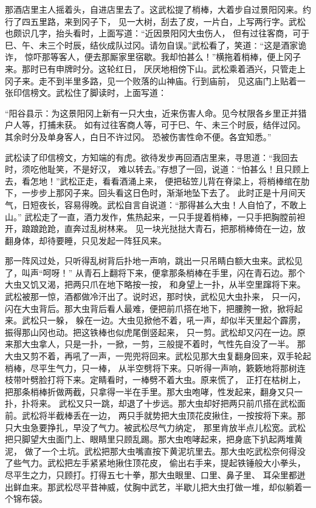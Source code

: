 \documentclass[12pt,UTF8]{ctexbook}
\begin{document}
那酒店里主人摇着头，自进店里去了。这武松提了梢棒，大着步自过景阳冈来。约行了四五里路，来到冈子下，
见一大树，刮去了皮，一片白，上写两行字。武松也颇识几字，抬头看时，上面写道：“近因景阳冈大虫伤人，
但有过往客商，可于巳、午、未三个时辰，结伙成队过冈。请勿自误。”武松看了，笑道∶“这是酒家诡诈，
惊吓那等客人，便去那厮家里宿歇。我却怕甚么！”横拖着梢棒，便上冈子来。那时已有申牌时分。这轮红日，
厌厌地相傍下山。武松乘着酒兴，只管走上冈子来。走不到半里多路，见一个败落的山神庙。行到庙前，
见这庙门上贴着一张印信榜文。武松住了脚读时，上面写道：

“阳谷县示：为这景阳冈上新有一只大虫，近来伤害人命。见今杖限各乡里正并猎户人等，打捕未获。
如有过往客商人等，可于巳、午、未三个时辰，结伴过冈。其余时分及单身客人，白日不许过冈。
恐被伤害性命不便。各宜知悉。”

武松读了印信榜文，方知端的有虎。欲待发步再回酒店里来，寻思道：“我回去时，须吃他耻笑，不是好汉，
难以转去。”存想了一回，说道：“怕甚么！且只顾上去，看怎地！”武松正走，看看酒涌上来，
便把毡笠儿背在脊梁上，将梢棒绾在肋下，一步步上那冈子来。回头看这日色时，渐渐地坠下去了。
此时正是十月间天气，日短夜长，容易得晚。武松自言自说道：“那得甚么大虫！人自怕了，不敢上山。”
武松走了一直，酒力发作，焦热起来，一只手提着梢棒，一只手把胸膛前袒开，踉踉跄跄，直奔过乱树林来。
见一块光挞挞大青石，把那梢棒倚在一边，放翻身体，却待要睡，只见发起一阵狂风来。

那一阵风过处，只听得乱树背后扑地一声响，跳出一只吊睛白额大虫来。武松见了，叫声“呵呀！”
从青石上翻将下来，便拿那条梢棒在手里，闪在青石边。那个大虫又饥又渴，把两只爪在地下略按一按，
和身望上一扑，从半空里蹿将下来。武松被那一惊，酒都做冷汗出了。说时迟，那时快，武松见大虫扑来，
只一闪，闪在大虫背后。那大虫背后看人最难，便把前爪搭在地下，把腰胯一掀，掀将起来。武松只一躲，
躲在一边。大虫见掀他不着，吼一声，却似半天里起个霹雳，振得那山冈也动。把这铁棒也似虎尾倒竖起来，
只一剪。武松却又闪在一边。原来那大虫拿人，只是一扑，一掀，一剪，三般提不着时，气性先自没了一半。
那大虫又剪不着，再吼了一声，一兜兜将回来。武松见那大虫复翻身回来，双手轮起梢棒，尽平生气力，只一棒，
从半空劈将下来。只听得一声响，簌簌地将那树连枝带叶劈脸打将下来。定睛看时，一棒劈不着大虫。原来慌了，
正打在枯树上，把那条梢棒折做两截，只拿得一半在手里。那大虫咆哮，性发起来，翻身又只一扑，扑将来。
武松又只一跳，却退了十步远。那大虫却好把两只前爪搭在武松面前。武松将半截棒丢在一边，
两只手就势把大虫顶花皮揪住，一按按将下来。那只大虫急要挣扎，早没了气力。被武松尽气力纳定，
那里肯放半点儿松宽。武松把只脚望大虫面门上、眼睛里只顾乱踢。那大虫咆哮起来，把身底下扒起两堆黄泥，
做了一个土坑。武松把那大虫嘴直按下黄泥坑里去。那大虫吃武松奈何得没了些气力。武松把左手紧紧地揪住顶花皮，
偷出右手来，提起铁锤般大小拳头，尽平生之力，只顾打。打得五七十拳，那大虫眼里、口里、鼻子里、
耳朵里都迸出鲜血来。那武松尽平昔神威，仗胸中武艺，半歇儿把大虫打做一堆，却似躺着一个锦布袋。
\end{document}
